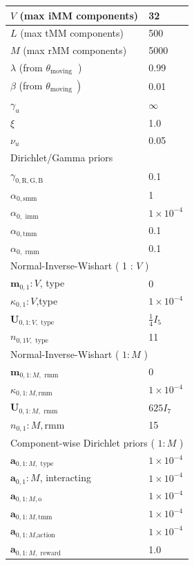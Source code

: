 \documentclass[10pt]{article}
\begin{document}
\begin{table}[h]
\begin{center}
\begin{tabular}{|l|l|}
\hline
$V$ (max iMM components) & 32 \\
\hline
$L$ (max tMM components) & 500 \\
\hline
$M$ (max rMM components) & 5000 \\
\hline
$\lambda$ (from $\theta_{\text {moving }}$ ) & 0.99 \\
\hline
$\beta$ (from $\left.\theta_{\text {moving }}\right)$ & 0.01 \\
\hline
$\gamma_{u}$ & $\infty$ \\
\hline
$\xi$ & 1.0 \\
\hline
$\nu_{u}$ & 0.05 \\
\hline
\multicolumn{2}{|l|}{Dirichlet/Gamma priors} \\
\hline
$\gamma_{0, \mathrm{R}, \mathrm{G}, \mathrm{B}}$ & 0.1 \\
\hline
$\alpha_{0, \mathrm{smm}}$ & 1 \\
\hline
$\alpha_{0, \text { imm }}$ & $1 \times 10^{-4}$ \\
\hline
$\alpha_{0, \mathrm{tmm}}$ & 0.1 \\
\hline
$\alpha_{0, \text { rmm }}$ & 0.1 \\
\hline
\multicolumn{2}{|l|}{Normal-Inverse-Wishart ( 1 : $V$ )} \\
\hline
$\mathbf{m}_{0,1}: V$, type & 0 \\
\hline
$\kappa_{0,1}: V$,type & $1 \times 10^{-4}$ \\
\hline
$\mathbf{U}_{0,1: V, \text { type }}$ & $\frac{1}{4} I_{5}$ \\
\hline
$n_{0,1 V, \text { type }}$ & 11 \\
\hline
\multicolumn{2}{|l|}{Normal-Inverse-Wishart ( $1: M$ )} \\
\hline
$\mathbf{m}_{0,1: M, \text { rmm }}$ & 0 \\
\hline
$\kappa_{0,1: M, \mathrm{rmm}}$ & $1 \times 10^{-4}$ \\
\hline
$\mathbf{U}_{0,1: M, \text { rmm }}$ & $625 I_{7}$ \\
\hline
$n_{0,1}: M, \mathrm{rmm}$ & 15 \\
\hline
\multicolumn{2}{|l|}{Component-wise Dirichlet priors ( $1: M$ )} \\
\hline
$\mathbf{a}_{0,1: M, \text { type }}$ & $1 \times 10^{-4}$ \\
\hline
$\mathbf{a}_{0,1}: M$, interacting & $1 \times 10^{-4}$ \\
\hline
$\mathbf{a}_{0,1: M, \mathrm{o}}$ & $1 \times 10^{-4}$ \\
\hline
$\mathbf{a}_{0,1: M, \mathrm{tmm}}$ & $1 \times 10^{-4}$ \\
\hline
$\mathbf{a}_{0,1: M \text {,action }}$ & $1 \times 10^{-4}$ \\
\hline
$\mathbf{a}_{0,1: M, \text { reward }}$ & 1.0 \\
\hline
\end{tabular}
\end{center}
\end{table}
\end{document}
